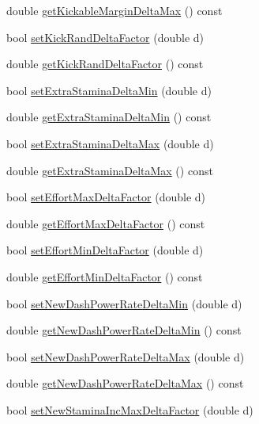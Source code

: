 \begin{DoxyCompactItemize}
double \hyperlink{classServerSettings_acf96251b45264e562b111a8cb6bc17f0}{get\+Kickable\+Margin\+Delta\+Max} () const 
\item 
bool \hyperlink{classServerSettings_aa63a5ea0705aaa18d7ab8b00752ca744}{set\+Kick\+Rand\+Delta\+Factor} (double d)
\item 
double \hyperlink{classServerSettings_a5f6694b556bb82c0e4f288f2680af399}{get\+Kick\+Rand\+Delta\+Factor} () const 
\item 
bool \hyperlink{classServerSettings_ad5fbafa4026c2c81bacaf588dd4d3b8b}{set\+Extra\+Stamina\+Delta\+Min} (double d)
\item 
double \hyperlink{classServerSettings_acf2beb30b73d2488b6227b6f323bc716}{get\+Extra\+Stamina\+Delta\+Min} () const 
\item 
bool \hyperlink{classServerSettings_aa672ed84f340a7516e2bbed2c74e336a}{set\+Extra\+Stamina\+Delta\+Max} (double d)
\item 
double \hyperlink{classServerSettings_af04f8ef0354a17fe981a6cf69ae7b8b6}{get\+Extra\+Stamina\+Delta\+Max} () const 
\item 
bool \hyperlink{classServerSettings_ae59b47a83a58668b4ad2bd46b5b7d3df}{set\+Effort\+Max\+Delta\+Factor} (double d)
\item 
double \hyperlink{classServerSettings_a6a8d9120c34b43910f7620841e4000cf}{get\+Effort\+Max\+Delta\+Factor} () const 
\item 
bool \hyperlink{classServerSettings_a8970efdf9782d2896e5dd718d6d094a1}{set\+Effort\+Min\+Delta\+Factor} (double d)
\item 
double \hyperlink{classServerSettings_a352b24e33ccbc7be3330d7af2c852e6c}{get\+Effort\+Min\+Delta\+Factor} () const 
\item 
bool \hyperlink{classServerSettings_a77958b0b18db2177d5f25ec12e6a9ed1}{set\+New\+Dash\+Power\+Rate\+Delta\+Min} (double d)
\item 
double \hyperlink{classServerSettings_aad1659c992f6893a51fda7c8ce36fc93}{get\+New\+Dash\+Power\+Rate\+Delta\+Min} () const 
\item 
bool \hyperlink{classServerSettings_a3ff4672fd3702001162dfc3f7e139431}{set\+New\+Dash\+Power\+Rate\+Delta\+Max} (double d)
\item 
double \hyperlink{classServerSettings_a4942128c18070883debd4bde229c650a}{get\+New\+Dash\+Power\+Rate\+Delta\+Max} () const 
\item 
bool \hyperlink{classServerSettings_aeb922be1a2b91caa13447ffe7647a174}{set\+New\+Stamina\+Inc\+Max\+Delta\+Factor} (double d)
\item 

\end{DoxyCompactItemize}
